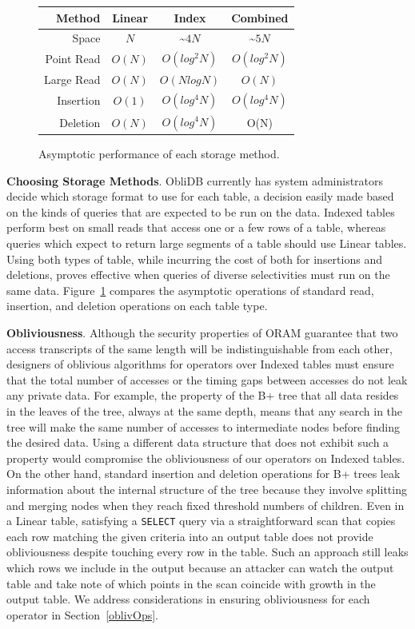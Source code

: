 \documentclass[letterpaper,twocolumn,10pt]{article}
\def\name/{ObliDB}
\begin{document}
\begin{figure}
\small
\center
\begin{tabular}{r|ccc}
Method&Linear&Index&Combined\\\hline
Space &$N$&\textasciitilde$4N$&\textasciitilde$5N$\\
Point Read&$O(N)$&$O(log^2N)$&$O(log^2N)$\\
Large Read&$O(N)$&$O(NlogN)$&$O(N)$\\
Insertion&$O(1)$&$O(log^4N)$&$O(log^4N)$\\
Deletion&$O(N)$&$O(log^4N)$&O(N)\\
\end{tabular}
\caption{\small Asymptotic performance of each storage method.}
\label{asymTables}
\end{figure}

\noindent \textbf{Choosing Storage Methods}. \name/ currently has system administrators decide which storage format to use for each table, a decision easily made based on the kinds of queries that are expected to be run on the data. Indexed tables perform best on small reads that access one or a few rows of a table, whereas queries which expect to return large segments of a table should use Linear tables. Using both types of table, while incurring the cost of both for insertions and deletions, proves effective when queries of diverse selectivities must run on the same data. Figure~\ref{asymTables} compares the asymptotic operations of standard read, insertion, and deletion operations on each table type.

 \noindent \textbf{Obliviousness}. Although the security properties of ORAM guarantee that two access transcripts of the same length will be indistinguishable from each other, designers of oblivious algorithms for operators over Indexed tables must ensure that the total number of accesses or the timing gaps between accesses do not leak any private data. For example, the property of the B+ tree that all data resides in the leaves of the tree, always at the same depth, means that any search in the tree will make the same number of accesses to intermediate nodes before finding the desired data. Using a different data structure that does not exhibit such a property would compromise the obliviousness of our operators on Indexed tables. On the other hand, standard insertion and deletion operations for B+ trees leak information about the internal structure of the tree because they involve splitting and merging nodes when they reach fixed threshold numbers of children. Even in a Linear table, satisfying a \texttt{SELECT} query via a straightforward scan that copies each row matching the given criteria into an output table does not provide obliviousness despite touching every row in the table. Such an approach still leaks which rows we include in the output because an attacker can watch the output table and take note of which points in the scan coincide with growth in the output table. We address considerations in ensuring obliviousness for each operator in Section~\ref{oblivOps}.
\end{document}
